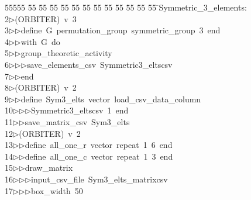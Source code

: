 %
%
\begin{tabbing}
55555 \= 55 \= 55 \= 55 \= 55 \= 55 \= 55 \= 55 \= 55 \= 55 \= 55 \= 55 \= 55 \= \>Symmetric\_3\_elements:\\[0pt]
2\>$\triangleright$\>(ORBITER)\ v\ 3\ \\[0pt]
3\>$\triangleright$\>$\triangleright$\>define\ G\ permutation\_group\ symmetric\_group\ 3\ end\ \\[0pt]
4\>$\triangleright$\>$\triangleright$\>with\ G\ do\ \\[0pt]
5\>$\triangleright$\>$\triangleright$\>group\_theoretic\_activity\ \\[0pt]
6\>$\triangleright$\>$\triangleright$\>$\triangleright$\>save\_elements\_csv\ Symmetric3\_eltscsv\ \\[0pt]
7\>$\triangleright$\>$\triangleright$\>end\\[0pt]
8\>$\triangleright$\>(ORBITER)\ v\ 2\ \\[0pt]
9\>$\triangleright$\>$\triangleright$\>define\ Sym3\_elts\ vector\ load\_csv\_data\_column\ \\[0pt]
10\>$\triangleright$\>$\triangleright$\>$\triangleright$\>Symmetric3\_eltscsv\ 1\ end\ \\[0pt]
11\>$\triangleright$\>$\triangleright$\>save\_matrix\_csv\ Sym3\_elts\ \\[0pt]
12\>$\triangleright$\>(ORBITER)\ v\ 2\ \\[0pt]
13\>$\triangleright$\>$\triangleright$\>define\ all\_one\_r\ vector\ repeat\ 1\ 6\ end\ \\[0pt]
14\>$\triangleright$\>$\triangleright$\>define\ all\_one\_c\ vector\ repeat\ 1\ 3\ end\ \\[0pt]
15\>$\triangleright$\>$\triangleright$\>draw\_matrix\ \\[0pt]
16\>$\triangleright$\>$\triangleright$\>$\triangleright$\>input\_csv\_file\ Sym3\_elts\_matrixcsv\ \\[0pt]
17\>$\triangleright$\>$\triangleright$\>$\triangleright$\>box\_width\ 50\ \\[0pt]

\end{tabbing}
